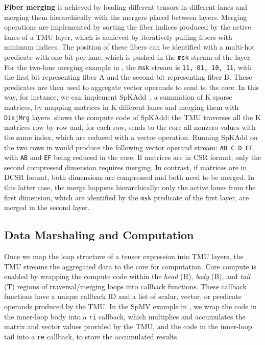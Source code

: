 \noindent\textbf{Fiber merging} is achieved by loading different tensors in different lanes and merging them hierarchically with the mergers placed between layers.
Merging operations are implemented by sorting the fiber indices produced by the active lanes of a TMU layer, which is achieved by iteratively pulling fibers with minimum indices.
The position of these fibers can be identified with a multi-hot predicate with one bit per lane, which is pushed in the \texttt{msk} stream of the layer.
For the two-lane merging example in , the \texttt{msk} stream is \texttt{11, 01, 10, 11}, with the first bit representing fiber A and the second bit representing fiber B.
These predicates are then used to aggregate vector operands to send to the core.
In this way, for instance, we can implement SpKAdd~\cite{hussain2022ipdps}, a summation of K sparse matrices, by mapping matrices in K different lanes and merging them with \texttt{DisjMrg} layers.
 shows the compute code of SpKAdd: the TMU traverses all the K matrices row by row and, for each row, sends to the core all nonzero values with the same index, which are reduced with a vector operation.
Running SpKAdd on the two rows in  would produce the following vector operand stream: \texttt{AB C D EF}, with \texttt{AB} and \texttt{EF} being reduced in the core.
If matrices are in CSR format, only the second compressed dimension requires merging.
In contrast, if matrices are in DCSR format, both dimensions are compressed and both need to be merged.
In this latter case, the merge happens hierarchically: only the active lanes from the first dimension, which are identified by the \texttt{msk} predicate of the first layer, are merged in the second layer.

\subsection{Data Marshaling and Computation} \label{sec:tmu-marshaling-computation} %

Once we map the loop structure of a tensor expression into TMU layers, the TMU streams the aggregated data to the core for computation. Core compute is enabled by wrapping the compute code within the \textit{head} (H), \textit{body} (B), and \textit{tail} (T) regions of traversal/merging loops into callback functions. %
These callback functions have a unique callback ID and a list of scalar, vector, or predicate operands produced by the TMU.
In the SpMV example in , we wrap the code in the inner-loop body into a \texttt{ri} callback, which multiplies and accumulates the matrix and vector values provided by the TMU, and the code in the inner-loop tail into a \texttt{re} callback, to store the accumulated results.

